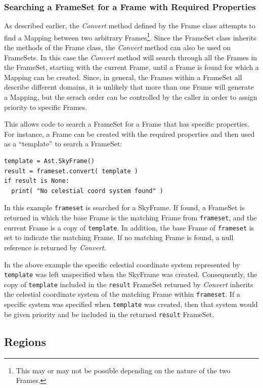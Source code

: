 \documentclass[final,authoryear,5p,times,twocolumn]{elsarticle}
\begin{document}
\subsubsection{Searching a FrameSet for a Frame with Required Properties}
As described earlier, the \emph{Convert} method defined by the Frame
class attempts to find a Mapping between two arbitrary
Frames\footnote{This may or may not be possible depending on the nature
of the two Frames.}. Since the FrameSet class inherits the methods of the
Frame class, the \emph{Convert} method can also be used on FrameSets. In
this case the \emph{Convert} method will search through all the Frames
in the FrameSet, starting with the current Frame, until a Frame is found
for which a Mapping can be created. Since, in general, the Frames within a
FrameSet all describe different domains, it is unlikely that more than one
Frame will generate a Mapping, but the serach order can be controlled by
the caller in order to assign priority to specific Frames.

This allows code to search a FrameSet for a Frame that has specific
properties. For instance, a Frame can be created with the required
properties and then used as a ``template'' to search a FrameSet:

\begin{lstlisting}
template = Ast.SkyFrame()
result = frameset.convert( template )
if result is None:
  print( "No celestial coord system found" )
\end{lstlisting}

In this example \texttt{frameset} is searched for a SkyFrame. If found, a
FrameSet is returned in which the base Frame is the matching Frame from
\texttt{frameset}, and the current Frame is a copy of \texttt{template}.
In addition, the base Frame of \texttt{frameset} is set to indicate the
matching Frame. If no matching Frame is found, a null reference is
returned by \emph{Convert}.

In the above example the specific celestial coordinate system represented
by \texttt{template} was left unspecified when the SkyFrame was created.
Consequently, the copy of \texttt{template} included in the
\texttt{result} FrameSet returned by \emph{Convert} inherits the
celestial coordinate system of the matching Frame within
\texttt{frameset}. If a specific system was specified when \texttt{template}
was created, then that system would be given priority and be included in
the returned \texttt{result} FrameSet.

\subsection{Regions}
\label{sec:region}
\end{document}
